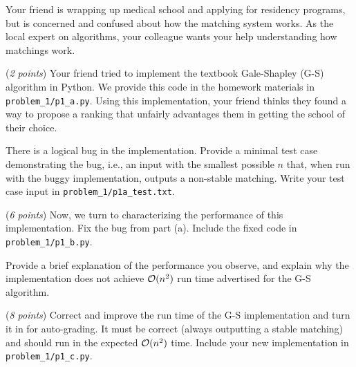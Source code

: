 \documentclass{hw}
\begin{document}
\newpage



\begin{problem}
Your friend is wrapping up medical school
and applying for residency programs, but is concerned and confused about how the matching
system works. As the local expert on algorithms, your colleague wants your 
help understanding how matchings work. 


\begin{subproblem}
  (\textit{2 points})
  Your friend tried to implement the textbook Gale-Shapley (G-S)
  algorithm in Python. We provide this code in the homework materials in \texttt{problem\_1/p1\_a.py}. 
  Using this implementation, your friend thinks they found a way to propose a
  ranking that unfairly advantages them in getting the school of their choice.

  There is a logical bug in the implementation. Provide a minimal test case
  demonstrating the bug, i.e., an input with the smallest possible $n$ 
  that, when run with the buggy implementation, outputs a non-stable matching. Write your test case input in \texttt{problem\_1/p1a\_test.txt}.  
  
\end{subproblem}


\begin{subproblem}
  (\textit{6 points})
  Now, we turn to characterizing the performance of
  this implementation. Fix the bug from part (a). Include the fixed code in \texttt{problem\_1/p1\_b.py}.

  Provide a brief explanation of the performance you observe, and explain why the implementation does not achieve $\mathcal{O}(n^2)$ run time advertised for the G-S algorithm.
\end{subproblem}

\begin{subproblem}
\newcommand{\worstrank}{{\tt wr}}
  (\textit{8 points})
    Correct and improve the run time of the G-S implementation and turn it in for auto-grading. It must be correct (always outputting a stable matching) and should run in the expected $\mathcal{O}(n^2)$ time. Include your new implementation in \texttt{problem\_1/p1\_c.py}. 
    

\end{subproblem}
\end{problem}
\end{document}

